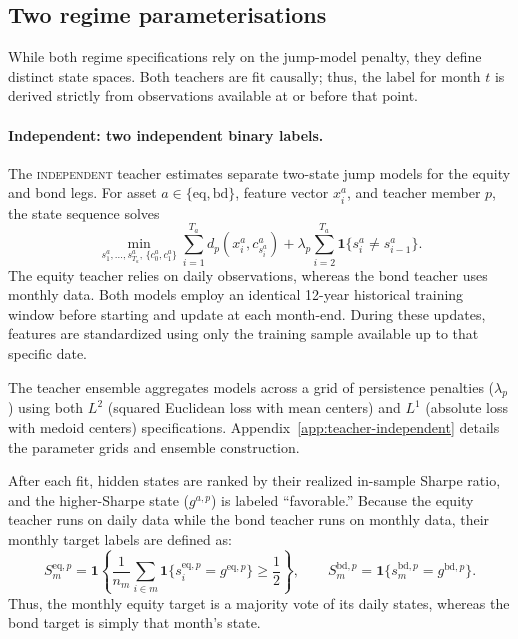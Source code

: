\documentclass[10pt]{article}
\newcommand{\Bindep}{\textsc{independent}}
\begin{document}
\subsection{Two regime parameterisations}
\label{sec:two-parameterisations}

While both regime specifications rely on the jump-model penalty, they define distinct state spaces. Both teachers are fit causally; thus, the label for month $t$ is derived strictly from observations available at or before that point.

\paragraph{Independent: two independent binary labels.}
The \Bindep{} teacher estimates separate two-state jump models for the equity and bond legs. For asset \(a\in\{\mathrm{eq},\mathrm{bd}\}\), feature vector \(x^a_i\), and teacher member \(p\), the state sequence solves
\begin{equation}
    \min_{s^a_1,\dots,s^a_{T_a},\,\{c^a_0,c^a_1\}}
    \sum_{i=1}^{T_a} d_p\!\left(x^a_i,c^a_{s^a_i}\right)
    +\lambda_p\sum_{i=2}^{T_a}\mathbf{1}\{s^a_i\neq s^a_{i-1}\}.
    \label{eq:independent-teacher}
\end{equation}
The equity teacher relies on daily observations, whereas the bond teacher uses monthly data. Both models employ an identical 12-year historical training window before starting and update at each month-end. During these updates, features are standardized using only the training sample available up to that specific date.

The teacher ensemble aggregates models across a grid of persistence penalties ($\lambda_p$) using both $L^2$ (squared Euclidean loss with mean centers) and $L^1$ (absolute loss with medoid centers) specifications. Appendix~\ref{app:teacher-independent} details the parameter grids and ensemble construction.

After each fit, hidden states are ranked by their realized in-sample Sharpe ratio, and the higher-Sharpe state ($g^{a,p}$) is labeled ``favorable.'' Because the equity teacher runs on daily data while the bond teacher runs on monthly data, their monthly target labels are defined as:
\begin{equation}
    S^{\mathrm{eq},p}_m
    =
    \mathbf{1}\!\left\{
    \frac{1}{n_m}\sum_{i\in m}\mathbf{1}\{s^{\mathrm{eq},p}_i=g^{\mathrm{eq},p}\}
    \ge \frac{1}{2}
    \right\},
    \qquad
    S^{\mathrm{bd},p}_m
    =
    \mathbf{1}\{s^{\mathrm{bd},p}_m=g^{\mathrm{bd},p}\}.
    \label{eq:independent-monthly-label}
\end{equation}
Thus, the monthly equity target is a majority vote of its daily states, whereas the bond target is simply that month's state.
\end{document}
